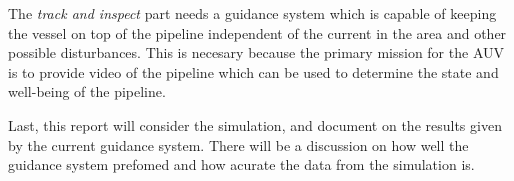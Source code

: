 	The \textit{track and inspect} part needs a guidance system which is capable of keeping the vessel on top of the pipeline independent of the current in the area and other possible disturbances. This is necesary because the primary mission for the AUV is to provide video of the pipeline which can be used to determine the state and well-being of the pipeline.
	
	Last, this report will consider the simulation, and document on the results given by the current guidance system. There will be a discussion on how well the guidance system prefomed and how acurate the data from the simulation is. 
	

